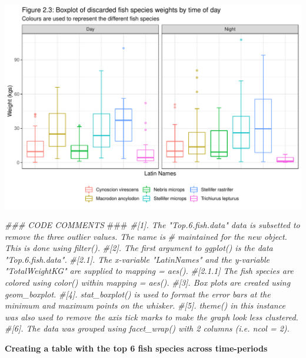 \documentclass[
]{book}
\newenvironment{Shaded}{\begin{snugshade}}{\end{snugshade}}
\newcommand{\AlertTok}[1]{\textcolor[rgb]{0.94,0.16,0.16}{#1}}
\newcommand{\CommentTok}[1]{\textcolor[rgb]{0.56,0.35,0.01}{\textit{#1}}}
\begin{document}
\begin{center}\includegraphics{bookdown-demo_files/figure-latex/unnamed-chunk-13-1} \end{center}

\begin{Shaded}
\begin{Highlighting}[]
\CommentTok{### CODE COMMENTS }\AlertTok{###}
\CommentTok{#[1]. The "Top.6.fish.data" data is subsetted to remove the three outlier values. The name is }
\CommentTok{#     maintained for the new object. This is done using filter().}
\CommentTok{#[2]. The first argument to ggplot() is the data "Top.6.fish.data". }
\CommentTok{#[2.1]. The x-variable "LatinNames" and the y-variable "TotalWeightKG" are supplied to mapping = aes(). }
\CommentTok{#[2.1.1] The fish species are colored using color() within mapping = aes().     }
\CommentTok{#[3]. Box plots are created using geom_boxplot.}
\CommentTok{#[4]. stat_boxplot() is used to format the error bars at the minimum and maximum points on the whisker. }
\CommentTok{#[5]. theme() in this instance was also used to remove the axis tick marks to make the graph look less clustered. }
\CommentTok{#[6]. The data was grouped using facet_wrap() with 2 columns (i.e. ncol = 2).   }
\end{Highlighting}
\end{Shaded}

\textbf{Creating a table with the top 6 fish species across time-periods}
\end{document}
